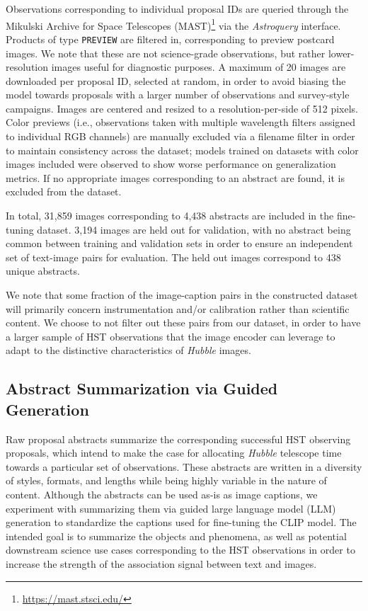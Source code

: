 \documentclass[10pt]{article} %
\newcommand{\package}[1]{\textsl{#1}\xspace}
\newcommand{\hubble}{\emph{Hubble}\xspace}
\begin{document}
Observations corresponding to individual proposal IDs are queried through the Mikulski Archive for Space Telescopes (MAST)\footnote{\url{https://mast.stsci.edu/}} via the \package{Astroquery} \citep{2019AJ....157...98G} interface.
%
Products of type \texttt{PREVIEW} are filtered in, corresponding to preview postcard images.
%
We note that these are not science-grade observations, but rather lower-resolution images useful for diagnostic purposes.
%
A maximum of 20 images are downloaded per proposal ID, selected at random, in order to avoid biasing the model towards proposals with a larger number of observations and survey-style campaigns.
%
Images are centered and resized to a resolution-per-side of 512 pixels.
%
Color previews (i.e., observations taken with multiple wavelength filters assigned to individual RGB channels) are manually excluded via a filename filter in order to maintain consistency across the dataset; models trained on datasets with color images included were observed to show worse performance on generalization metrics.
%
If no appropriate images corresponding to an abstract are found, it is excluded from the dataset.

In total, 31,859 images corresponding to 4,438 abstracts are included in the fine-tuning dataset.
%
3,194 images are held out for validation, with no abstract being common between training and validation sets in order to ensure an independent set of text-image pairs for evaluation. The held out images correspond to 438 unique abstracts.  %

We note that some fraction of the image-caption pairs in the constructed dataset will primarily concern instrumentation and/or calibration rather than scientific content.
%
We choose to not filter out these pairs from our dataset, in order to have a larger sample of HST observations that the image encoder can leverage to adapt to the distinctive characteristics of \hubble images.


\subsection{Abstract Summarization via Guided Generation}
\label{sec:summarization}

Raw proposal abstracts summarize the corresponding successful HST observing proposals, which intend to make the case for allocating \hubble telescope time towards a particular set of observations.
%
These abstracts are written in a diversity of styles, formats, and lengths while being highly variable in the nature of content.
%
Although the abstracts can be used as-is as image captions, we experiment with summarizing them via guided large language model (LLM) generation to standardize the captions used for fine-tuning the CLIP model.
%
The intended goal is to summarize the objects and phenomena, as well as potential downstream science use cases corresponding to the HST observations in order to increase the strength of the association signal between text and images.
\end{document}
